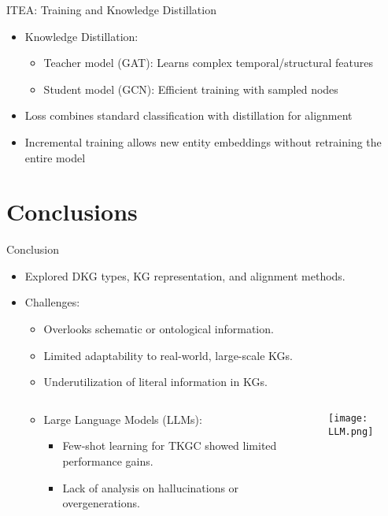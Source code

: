 \documentclass{beamer}
\begin{document}
    \begin{frame}{ITEA: Training and Knowledge Distillation}
        \begin{itemize}
            \item Knowledge Distillation:
            \begin{itemize}
                \item Teacher model (GAT): Learns complex temporal/structural features
                \item Student model (GCN): Efficient training with sampled nodes
            \end{itemize}
            \item Loss combines standard classification with distillation for alignment
            \item Incremental training allows new entity embeddings without retraining the entire model
        \end{itemize}
    \end{frame}

    
    \section{Conclusions}
    
    \begin{frame}{Conclusion}
        \begin{itemize}
            \item Explored DKG types, KG representation, and alignment methods.
            \item Challenges:
            \begin{itemize}
                \item Overlooks schematic or ontological information.
                \item Limited adaptability to real-world, large-scale KGs.
                \item Underutilization of literal information in KGs.
            \end{itemize}
            \begin{columns}
            \begin{column}{0.5\textwidth}
                \begin{itemize}
                    \item Large Language Models (LLMs):
                    \begin{itemize}
                        \item Few-shot learning for TKGC showed limited performance gains.
                        \item Lack of analysis on hallucinations or overgenerations.
                    \end{itemize}
                \end{itemize}
            \end{column}
            \begin{column}{0.5\textwidth}
                \texttt{[image: LLM.png]}
            \end{column}
        \end{columns}
        \end{itemize}
    \end{frame}
\end{document}
